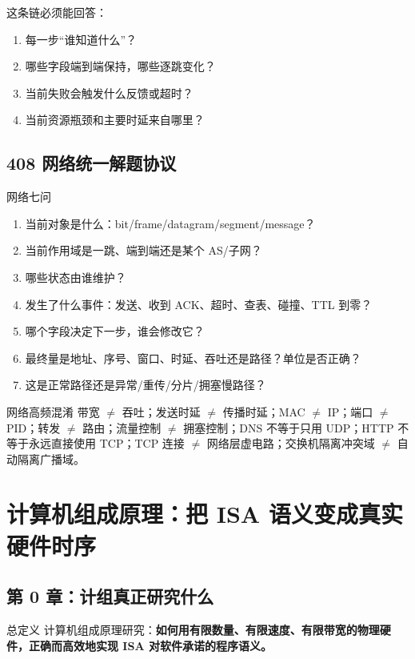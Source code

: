 \documentclass[11pt,a4paper,openany]{ctexbook}
\begin{document}
这条链必须能回答：
\begin{enumerate}
  \item 每一步“谁知道什么”？
  \item 哪些字段端到端保持，哪些逐跳变化？
  \item 当前失败会触发什么反馈或超时？
  \item 当前资源瓶颈和主要时延来自哪里？
\end{enumerate}

\section{408 网络统一解题协议}
\begin{examBox}{网络七问}
\begin{enumerate}
  \item 当前对象是什么：bit/frame/datagram/segment/message？
  \item 当前作用域是一跳、端到端还是某个 AS/子网？
  \item 哪些状态由谁维护？
  \item 发生了什么事件：发送、收到 ACK、超时、查表、碰撞、TTL 到零？
  \item 哪个字段决定下一步，谁会修改它？
  \item 最终量是地址、序号、窗口、时延、吞吐还是路径？单位是否正确？
  \item 这是正常路径还是异常/重传/分片/拥塞慢路径？
\end{enumerate}
\end{examBox}

\begin{warnbox}{网络高频混淆}
带宽 $\neq$ 吞吐；发送时延 $\neq$ 传播时延；MAC $\neq$ IP；端口 $\neq$ PID；转发 $\neq$ 路由；流量控制 $\neq$ 拥塞控制；DNS 不等于只用 UDP；HTTP 不等于永远直接使用 TCP；TCP 连接 $\neq$ 网络层虚电路；交换机隔离冲突域 $\neq$ 自动隔离广播域。
\end{warnbox}

\chapter{计算机组成原理：把 ISA 语义变成真实硬件时序}

\section{第 0 章：计组真正研究什么}
\begin{corebox}{总定义}
计算机组成原理研究：\textbf{如何用有限数量、有限速度、有限带宽的物理硬件，正确而高效地实现 ISA 对软件承诺的程序语义。}
\end{corebox}
\end{document}
